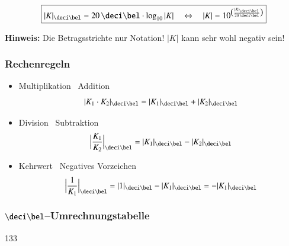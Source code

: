 \vspace{-0.2cm}

$$ \boxed{ |K|_{\deci \bel} = 20 \, \deci \bel \cdot \log_{10} |K| \quad \Leftrightarrow \quad 
            |K| = 10 ^{\big( \frac{|K|_{\deci \bel}}{20 \, \deci \bel}\big)}  } $$

\textbf{Hinweis:} Die Betragsstrichte nur Notation! $|K|$ kann sehr wohl negativ sein!


\subsubsection{Rechenregeln}

\begin{itemize}
    \item Multiplikation \textrightarrow\ Addition 
        \vspace{-0.2cm}
        $$ | K_1 \cdot K_2 |_{\deci \bel} = | K_1 |_{\deci \bel} + | K_2 |_{\deci \bel} $$
    \item Division \textrightarrow\ Subtraktion 
        $$ \Big| \frac{K_1}{K_2} \Big|_{\deci \bel} = | K_1 |_{\deci \bel} - | K_2 |_{\deci \bel} $$
    \item Kehrwert \textrightarrow\ Negatives Vorzeichen 
        $$ \Big| \frac{1}{K_1} \Big|_{\deci \bel} = | 1 |_{\deci \bel} - | K_1 |_{\deci \bel} = - | K_1 |_{\deci \bel} $$
\end{itemize}


\subsubsection[\deci \bel--Umrechnungstabelle]{$\boldsymbol{\deci \bel}$--Umrechnungstabelle}{133}

